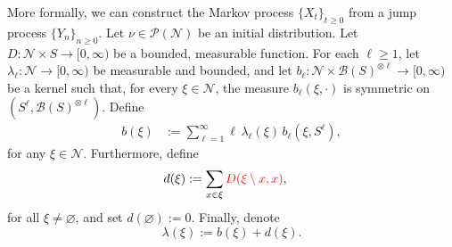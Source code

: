 \documentclass[12pt]{article}
\newcommand{\red}[1]{\textcolor{red}{#1}}
\newcounter{con}%
\numberwithin{equation}{section}
\begin{document}
More formally, we can construct the Markov process $\{X_t\}_{t\ge0}$ from a jump process $\{Y_n\}_{n\ge0}$. 
Let $\nu\in\mathscr{P}(\mathcal{N})$ be an initial distribution.
Let $D:\mathcal{N}\times S \to [0,\infty)$ be a bounded, measurable function. For each $\ell \ge 1$, let 
$\lambda_\ell : \mathcal{N} \to [0,\infty)$ be measurable and bounded, and let 
$b_\ell : \mathcal{N} \times \mathscr{B}(S)^{\otimes \ell} \to [0,\infty)$ be a kernel such that, for every 
$\xi \in \mathcal{N}$, the measure $b_\ell(\xi, \cdot)$ is symmetric on 
$(S^\ell, \mathscr{B}(S)^{\otimes \ell})$. Define
\begin{align}
    b(\xi) &:= \sum_{\ell=1}^{\infty} \ell\, \lambda_\ell(\xi)\, b_\ell(\xi, S^\ell),
\end{align}
for any $\xi \in \mathcal{N}$. Furthermore, define
\begin{align}
	d(\xi) &:= \sum_{x \in \xi} \red{D(\xi\setminus x, x)},
\end{align}
for all $\xi \neq \varnothing$, and set $d(\varnothing) := 0$.  
Finally, denote
\[
    \lambda(\xi) := b(\xi) + d(\xi).
\]
\end{document}
